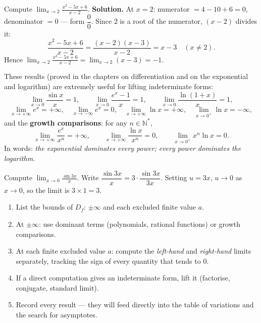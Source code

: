 \documentclass[11pt]{article}
\begin{document}
\begin{exoresolu}
Compute $\displaystyle\lim_{x\to 2}\frac{x^2-5x+6}{x-2}$.
\tcblower
\textbf{Solution.} At $x=2$: numerator $=4-10+6=0$, denominator $=0$ --- form $\dfrac{0}{0}$. Since $2$ is a root of the numerator, $(x-2)$ divides it:
\[
\frac{x^2-5x+6}{x-2}=\frac{(x-2)(x-3)}{x-2}=x-3 \quad (x\neq 2).
\]
Hence $\displaystyle\lim_{x\to 2}\frac{x^2-5x+6}{x-2}=\lim_{x\to 2}(x-3)=-1$.
\end{exoresolu}

\begin{aretenir}
These results (proved in the chapters on differentiation and on the exponential and logarithm) are extremely useful for lifting indeterminate forms:
\[
\lim_{x\to 0}\frac{\sin x}{x}=1,
\qquad
\lim_{x\to 0}\frac{e^x-1}{x}=1,
\qquad
\lim_{x\to 0}\frac{\ln(1+x)}{x}=1,
\]
\[
\lim_{x\to+\infty}e^x=+\infty,\quad
\lim_{x\to-\infty}e^x=0,\quad
\lim_{x\to+\infty}\ln x=+\infty,\quad
\lim_{x\to 0^+}\ln x=-\infty,
\]
and the \textbf{growth comparisons}: for any $n\in\mathbb{N}^*$,
\[
\lim_{x\to+\infty}\frac{e^x}{x^n}=+\infty,
\qquad
\lim_{x\to+\infty}\frac{\ln x}{x^n}=0,
\qquad
\lim_{x\to 0^+}x^n\ln x=0.
\]
In words: \emph{the exponential dominates every power; every power dominates the logarithm.}
\end{aretenir}

\begin{exemplebox}
Compute $\displaystyle\lim_{x\to 0}\frac{\sin 3x}{x}$. Write $\dfrac{\sin 3x}{x}=3\cdot\dfrac{\sin 3x}{3x}$. Setting $u=3x$, $u\to 0$ as $x\to 0$, so the limit is $3\times 1=3$.
\end{exemplebox}

\begin{methode}
\begin{enumerate}
\item List the bounds of $D_f$: $\pm\infty$ and each excluded finite value $a$.
\item At $\pm\infty$: use dominant terms (polynomials, rational functions) or growth comparisons.
\item At each finite excluded value $a$: compute the \emph{left-hand} and \emph{right-hand} limits separately, tracking the sign of every quantity that tends to $0$.
\item If a direct computation gives an indeterminate form, lift it (factorise, conjugate, standard limit).
\item Record every result --- they will feed directly into the table of variations and the search for asymptotes.
\end{enumerate}
\end{methode}
\end{document}
